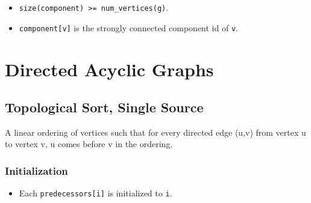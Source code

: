 {\small
      
}


\begin{itemdescr}
      \pnum\preconditions
            \begin{itemize}
                  \item
                        \lstinline{size(component) >= num_vertices(g)}.
            \end{itemize}
      \pnum\effects
            \begin{itemize}
                  \item
                        \lstinline{component[v]} is the strongly connected component id of \lstinline{v}.
            \end{itemize}
\end{itemdescr}

\section{Directed Acyclic Graphs}
\subsection{Topological Sort, Single Source}
A linear ordering of vertices such that for every directed edge (u,v) from vertex u to vertex v, u comes before v in the ordering.

\subsubsection{Initialization}

{\small
      
}

\begin{itemdescr}
      \effects
      \begin{itemize}
            \item
                  Each \lstinline{predecessors[i]} is initialized to \lstinline{i}.
      \end{itemize}
\end{itemdescr}

